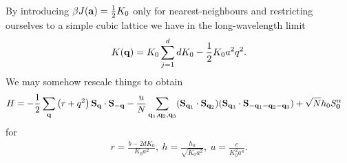 By introducing $\beta J(\vb{a}) = \frac{1}{2}K_{0}$ only for nearest-neighbours and restricting ourselves to a simple cubic lattice we have in the long-wavelength limit
\begin{align*}
	K(\vb{q}) = K_{0}\sum\limits_{j = 1}^{d}dK_{0} - \frac{1}{2}K_{0}a^{2}q^{2}.
\end{align*}
We may somehow rescale things to obtain
\begin{align*}
	H &= -\frac{1}{2}\sum\limits_{\vb{q}}\left(r + q^{2}\right)\vb{S}_{\vb{q}}\cdot\vb{S}_{-\vb{q}} - \frac{u}{N}\sum\limits_{\vb{q}_{1}, \vb{q}_{2}, \vb{q}_{3}}(\vb{S}_{\vb{q}_{1}}\cdot\vb{S}_{\vb{q}_{2}})(\vb{S}_{\vb{q}_{3}}\cdot\vb{S}_{-\vb{q}_{1} - \vb{q}_{2} - \vb{q}_{3}}) + \sqrt{N}h_{0}S_{\vb{0}}^{\alpha}
\end{align*}
for
\begin{align*}
	r = \frac{b - 2dK_{0}}{K_{0}a^{2}},\ h = \frac{h_{0}}{\sqrt{K_{0}a^{2}}},\ u = \frac{c}{K_{0}^{2}a^{4}}.
\end{align*}


